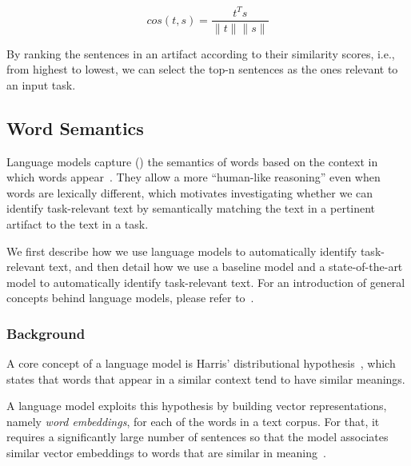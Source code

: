 \begin{equation}
    cos(t,s) = \frac{t^Ts}{\|t\| \|s\|}
    \label{eq:lex-sim}
\end{equation}
\smallskip

By ranking the sentences in an artifact according to their similarity scores, i.e., from highest to lowest,
we can  select the top-n sentences as the ones relevant to an input task.




\subsection{Word Semantics}


Language models capture () the semantics of words based on the context in which words appear~\cite{harris1954distributional}.
They allow a more ``human-like reasoning'' even when words are lexically different, which 
motivates investigating whether we can identify task-relevant text by semantically matching the text in a pertinent artifact to the text in a task.



We first describe how we use language models to automatically identify task-relevant text, and then
detail how we use a baseline model  and 
a state-of-the-art model to automatically identify task-relevant text.
For an introduction of general concepts behind language models, please refer to~\cite{zhang2021deep-learning}.

\subsubsection{Background}

A core concept of a language model is Harris' distributional hypothesis~\cite{harris1954distributional}, which states that words that appear in a similar context tend to have similar meanings.


A language model exploits this hypothesis by building vector representations, namely \textit{word embeddings}, for each of the words in a text corpus.
For that, it requires a significantly large number of sentences so that
the model associates similar vector embeddings to words that are similar in meaning~\cite{Ye2016}. 


